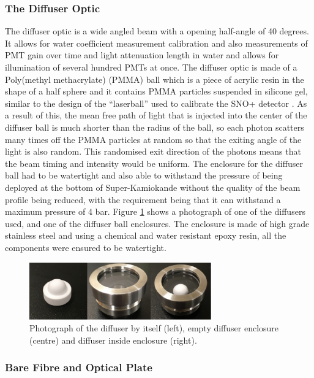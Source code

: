 \subsubsection{The Diffuser Optic}

The diffuser optic is a wide angled beam with a opening half-angle of 40 degrees. It allows for water coefficient measurement calibration and also measurements of PMT gain over time and light attenuation length in water and allows for illumination of several hundred PMTs at once. The diffuser optic is made of a Poly(methyl methacrylate) (PMMA) ball which is a piece of acrylic resin in the shape of a half sphere and it contains PMMA particles suspended in silicone gel, similar to the design of the ``laserball'' used to calibrate the SNO+ detector \cite{Moffat_2005}. As a result of this, the mean free path of light that is injected into the center of the diffuser ball is much shorter than the radius of the ball, so each photon scatters many times off the PMMA particles at random so that the exiting angle of the light is also random. This randomised exit direction of the photons means that the beam timing and intensity would be uniform.  
\newline
The enclosure for the diffuser ball had to be watertight and also able to withstand the pressure of being deployed at the bottom of Super-Kamiokande without the quality of the beam profile being reduced, with the requirement being that it can withstand a maximum pressure of 4 bar. Figure \ref{fig:diffuser_photo} shows a photograph of one of the diffusers used, and one of the diffuser ball enclosures. The enclosure is made of high grade stainless steel and using a chemical and water resistant epoxy resin, all the components were ensured to be watertight. 

\begin{figure}
    \centering
    \includegraphics[width=0.7\textwidth]{Figures/diffuser_photo.png}
    \caption{Photograph of the diffuser by itself (left), empty diffuser enclosure (centre) and diffuser inside enclosure (right).}
    \label{fig:diffuser_photo}
\end{figure}

\subsubsection{Bare Fibre and Optical Plate}

